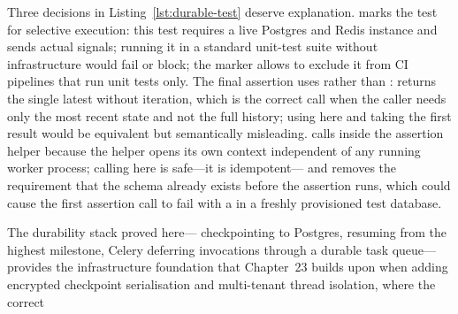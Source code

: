 Three decisions in Listing~\ref{lst:durable-test} deserve explanation.
 marks the test for selective execution:
this test requires a live Postgres and Redis instance and sends actual
 signals; running it in a standard unit-test suite without
infrastructure would fail or block; the  marker allows
 to exclude it from CI pipelines that
run unit tests only. The final assertion uses
 rather than
:  returns the single latest
 without iteration, which is the correct call when
the caller needs only the most recent state and not the full history;
using  here and taking the first result would be
equivalent but semantically misleading.  calls
 inside the assertion helper because the helper opens
its own  context independent of any running
worker process; calling  here is safe---it is idempotent---
and removes the requirement that the schema already exists before the
assertion runs, which could cause the first assertion call to fail with
a  in a freshly provisioned test database.

The durability stack proved here--- checkpointing
to Postgres,  resuming from the highest milestone,
Celery deferring invocations through a durable task queue---provides the
infrastructure foundation that Chapter~23 builds upon when adding
encrypted checkpoint serialisation and multi-tenant thread isolation,
where the correct
